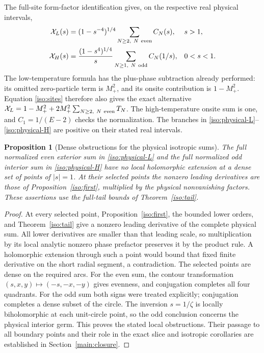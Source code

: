 \documentclass[11pt]{article}
\numberwithin{equation}{section}
\newtheorem{proposition}[theorem]{Proposition}
\theoremstyle{definition}
\begin{document}
The full-site form-factor identification gives, on the respective real
physical intervals,
\begin{align}
 \mathcal X_L(s)&=(1-s^{-4})^{1/4}
                  \sum_{N\ge2,\ N\ {\rm even}}C_N(s),
                  &&s>1,\label{iso:physical-L}\\
 \mathcal X_H(s)&=\frac{(1-s^4)^{1/4}}s
                  \sum_{N\ge1,\ N\ {\rm odd}}C_N(1/s),
                  &&0<s<1.\label{iso:physical-H}
\end{align}
The low-temperature formula has the plus-phase subtraction already
performed: its omitted zero-particle term is $M_+^2$, and its onsite
contribution is $1-M_+^2$. Equation \eqref{iso:sites} therefore also
gives the exact alternative
$\mathcal X_L=1-M_+^2+2M_+^2\sum_{N\ge2,\ N\ {\rm even}}T_N$.
The high-temperature onsite sum is one, and $C_1=1/(E-2)$ checks the
normalization. The branches in \eqref{iso:physical-L}--\eqref{iso:physical-H}
are positive on their stated real intervals.

\begin{proposition}[Dense obstructions for the physical isotropic sums]
\label{iso:local-obstruction}
The full normalized even exterior sum in \eqref{iso:physical-L}
and the full normalized odd interior sum in \eqref{iso:physical-H}
have no local holomorphic extension at a dense set of points of
\(|s|=1\). At their selected points the nonzero leading derivatives
are those of Proposition~\ref{iso:first}, multiplied by the physical
nonvanishing factors. These assertions use the full-tail
bounds of Theorem~\ref{iso:tail}.
\end{proposition}
\begin{proof}
At every selected point, Proposition~\ref{iso:first}, the bounded lower
orders, and Theorem~\ref{iso:tail} give a nonzero leading derivative of
the complete physical sum. All lower derivatives are smaller than that
leading scale, so multiplication by its local analytic nonzero phase
prefactor preserves it by the product rule. A holomorphic extension
through such a point would bound that fixed finite derivative on the
short radial segment, a contradiction. The selected points are dense on
the required arcs. For the even sum, the contour transformation
$(s,x,y)\mapsto(-s,-x,-y)$ gives evenness, and conjugation completes
all four quadrants. For the odd sum both signs were treated explicitly;
conjugation completes a dense subset of the circle. The inversion
\(s=1/\zeta\) is locally biholomorphic at each unit-circle point,
so the odd conclusion concerns the physical interior germ. This proves
the stated local obstructions. Their passage to all boundary points and
their role in the exact slice and isotropic corollaries are established
in Section~\ref{main:closure}.
\end{proof}
\end{document}
